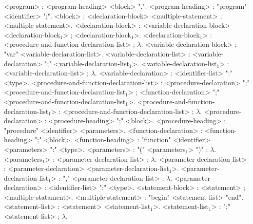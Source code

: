 \begin{grammar}
		
		
		<program> : <program-heading> <block> ".".
		<program-heading> : "program" <identifier> ";".
		<block> : <declaration-block> <multiple-statement> ; <multiple-statement>.
		<declaration-block> : <variable-declaration-block> <declaration-block$_1$> ; <declaration-block$_1$>.
        <declaration-block$_1$> : <procedure-and-function-declaration-list> ; $\lambda$.
		<variable-declaration-block> : "var" <variable-declaration-list>.
		<variable-declaration-list> : <variable-declaration> ";" <variable-declaration-list$_1$>.
        <variable-declaration-list$_1$> : <variable-declaration-list> ; $\lambda$.
		<variable-declaration> : <identifier-list> ":" <type>.
		<procedure-and-function-declaration-list> : <procedure-declaration> ";" <procedure-and-function-declaration-list$_1$> ; <function-declaration> ";" <procedure-and-function-declaration-list$_1$>.
        <procedure-and-function-declaration-list$_1$> : <procedure-and-function-declaration-list> ; $\lambda$.
		<procedure-declaration> : <procedure-heading> ";" <block>.
		<procedure-heading> : "procedure" <identifier> <parameters>.
		<function-declaration> : <function-heading> ";" <block>.
		<function-heading> : "function" <identifier> <parameters> ":" <type>.
        <parameters> : "(" <parameters$_1$> ")" ; $\lambda$.
        <parameters$_1$> : <parameter-declaration-list> ; $\lambda$.
		<parameter-declaration-list> : <parameter-declaration> <parameter-declaration-list$_1$>.
        <parameter-declaration-list$_1$> : "," <parameter-declaration-list> ; $\lambda$.
		<parameter-declaration> : <identifier-list> ":" <type>.
        <statement-block> : <statement> ; <multiple-statament>.
		<multiple-statement> : "begin" <statement-list> "end".
		<statement-list> : <statement> <statement-list$_1$>.
        <statement-list$_1$> : ";" <statement-list> ; $\lambda$.

\end{grammar}
